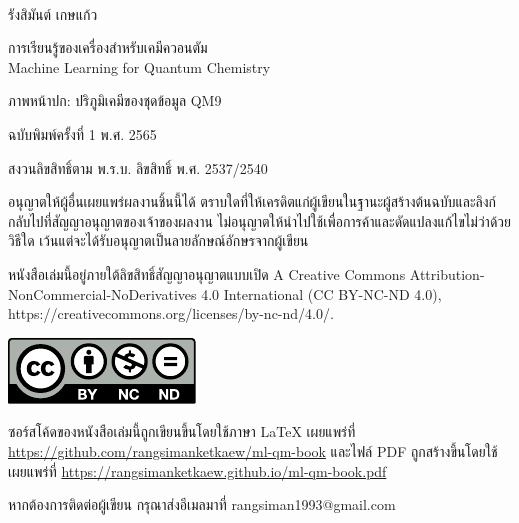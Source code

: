 

{
~\vfill
\thispagestyle{empty}
\setlength{\parindent}{0em}

รังสิมันต์ เกษแก้ว

การเรียนรู้ของเครื่องสำหรับเคมีควอนตัม\\
Machine Learning for Quantum Chemistry

ภาพหน้าปก: ปริภูมิเคมีของชุดข้อมูล QM9

\bigskip

\par{ฉบับพิมพ์ครั้งที่ 1 พ.ศ. 2565}

สงวนลิขสิทธิ์ตาม พ.ร.บ. ลิขสิทธิ์ พ.ศ. 2537/2540

อนุญาตให้ผู้อื่นเผยแพร่ผลงานชิ้นนี้ได้ ตราบใดที่ให้เครดิตแก่ผู้เขียนในฐานะผู้สร้างต้นฉบับและลิงก์กลับไปที่สัญญาอนุญาตของเจ้าของผลงาน 
ไม่อนุญาตให้นำไปใช้เพื่อการค้าและดัดแปลงแก้ไขไม่ว่าด้วยวิธีใด เว้นแต่จะได้รับอนุญาตเป็นลายลักษณ์อักษรจากผู้เขียน

หนังสือเล่มนี้อยู่ภายใต้ลิขสิทธิ์สัญญาอนุญาตแบบเปิด A Creative Commons Attribution-NonCommercial-NoDerivatives 4.0 
International (CC BY-NC-ND 4.0), https://creativecommons.org/licenses/by-nc-nd/4.0/.

\includegraphics[scale=1.2]{front_matter/by-nc-nd.pdf}

\bigskip

ซอร์สโค้ดของหนังสือเล่มนี้ถูกเขียนขึ้นโดยใช้ภาษา {\selectfont \LaTeX} เผยแพร่ที่ 
\url{https://github.com/rangsimanketkaew/ml-qm-book} และไฟล์ PDF ถูกสร้างขึ้นโดยใช้ {\selectfont 
\XeLaTeX} เผยแพร่ที่ \url{https://rangsimanketkaew.github.io/ml-qm-book.pdf}

หากต้องการติดต่อผู้เขียน กรุณาส่งอีเมลมาที่ rangsiman1993@gmail.com
}
